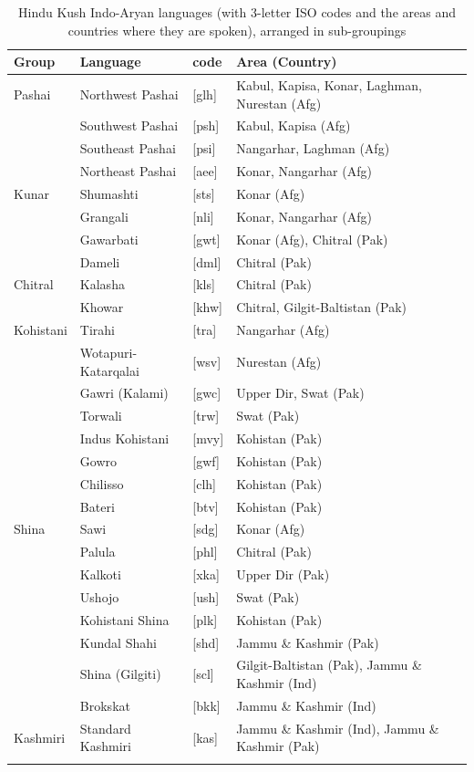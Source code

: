 \documentclass[output=collectionpaper]{langsci/langscibook}
\begin{document}
\begin{table}[p]
\small
\begin{tabularx}{\textwidth}{lll>{\raggedright\let\newline\\\arraybackslash\hspace{0pt}}X}
\lsptoprule
Group & Language & code & Area (Country)\\
\midrule
Pashai & Northwest Pashai & [glh] & Kabul, Kapisa, Konar, Laghman, Nurestan (Afg)\\
& Southwest Pashai & [psh] & Kabul, Kapisa (Afg)\\
& Southeast Pashai & [psi] & Nangarhar, Laghman (Afg)\\
& Northeast Pashai & [aee] & Konar, Nangarhar (Afg)\\
Kunar & Shumashti & [sts] & Konar (Afg)\\
& Grangali & [nli] & Konar, Nangarhar (Afg)\\
& Gawarbati & [gwt] & Konar (Afg), Chitral (Pak)\\
& Dameli & [dml] & Chitral (Pak)\\
Chitral & Kalasha & [kls] & Chitral (Pak)\\
& Khowar & [khw] & Chitral, Gilgit-Baltistan (Pak)\\
Kohistani & Tirahi & [tra] & Nangarhar (Afg)\\
& Wotapuri-Katarqalai & [wsv] & Nurestan (Afg)\\
& Gawri (Kalami) & [gwc] & Upper Dir, Swat (Pak)\\
& Torwali & [trw] & Swat (Pak)\\
& Indus Kohistani & [mvy] & Kohistan (Pak)\\
& Gowro & [gwf] & Kohistan (Pak)\\
& Chilisso & [clh] & Kohistan (Pak)\\
& Bateri & [btv] & Kohistan (Pak)\\
Shina & Sawi & [sdg] & Konar (Afg)\\
& Palula & [phl] & Chitral (Pak)\\
& Kalkoti & [xka] & Upper Dir (Pak)\\
& Ushojo & [ush] & Swat (Pak)\\
& Kohistani Shina & [plk] & Kohistan (Pak)\\
& Kundal Shahi & [shd] & Jammu \& Kashmir (Pak)\\
& Shina (Gilgiti) & [scl] & Gilgit-Baltistan (Pak), Jammu \& Kashmir (Ind)\\
& Brokskat & [bkk] & Jammu \& Kashmir (Ind)\\
Kashmiri & Standard Kashmiri & [kas] & Jammu \& Kashmir (Ind), Jammu \& Kashmir (Pak)\\
\lspbottomrule
\end{tabularx}
\caption{Hindu Kush Indo-Aryan languages (with 3-letter ISO codes and the areas and countries where they are spoken), arranged in sub-groupings}
\label{tab:Lilje:1}
\end{table}
\end{document}
